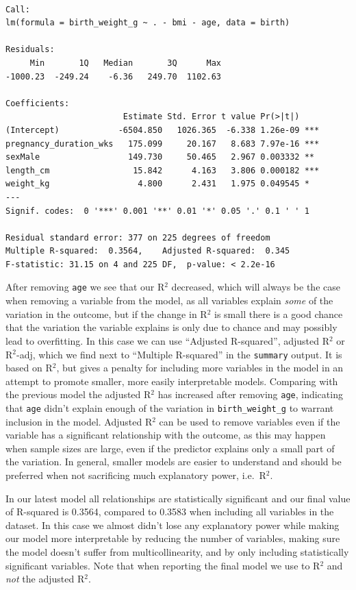 \documentclass[
  letterpaper,
  DIV=11,
  numbers=noendperiod]{scrreprt}
\begin{document}
\begin{verbatim}

Call:
lm(formula = birth_weight_g ~ . - bmi - age, data = birth)

Residuals:
     Min       1Q   Median       3Q      Max 
-1000.23  -249.24    -6.36   249.70  1102.63 

Coefficients:
                        Estimate Std. Error t value Pr(>|t|)    
(Intercept)            -6504.850   1026.365  -6.338 1.26e-09 ***
pregnancy_duration_wks   175.099     20.167   8.683 7.97e-16 ***
sexMale                  149.730     50.465   2.967 0.003332 ** 
length_cm                 15.842      4.163   3.806 0.000182 ***
weight_kg                  4.800      2.431   1.975 0.049545 *  
---
Signif. codes:  0 '***' 0.001 '**' 0.01 '*' 0.05 '.' 0.1 ' ' 1

Residual standard error: 377 on 225 degrees of freedom
Multiple R-squared:  0.3564,    Adjusted R-squared:  0.345 
F-statistic: 31.15 on 4 and 225 DF,  p-value: < 2.2e-16
\end{verbatim}

After removing \texttt{age} we see that our R\(^2\) decreased, which
will always be the case when removing a variable from the model, as all
variables explain \emph{some} of the variation in the outcome, but if
the change in R\(^2\) is small there is a good chance that the variation
the variable explains is only due to chance and may possibly lead to
overfitting. In this case we can use ``Adjusted R-squared'', adjusted
R\(^2\) or R\(^2\)-adj, which we find next to ``Multiple R-squared'' in
the \texttt{summary} output. It is based on R\(^2\), but gives a penalty
for including more variables in the model in an attempt to promote
smaller, more easily interpretable models. Comparing with the previous
model the adjusted R\(^2\) has increased after removing \texttt{age},
indicating that \texttt{age} didn't explain enough of the variation in
\texttt{birth\_weight\_g} to warrant inclusion in the model. Adjusted
R\(^2\) can be used to remove variables even if the variable has a
significant relationship with the outcome, as this may happen when
sample sizes are large, even if the predictor explains only a small part
of the variation. In general, smaller models are easier to understand
and should be preferred when not sacrificing much explanatory power,
i.e.~R\(^2\).

In our latest model all relationships are statistically significant and
our final value of R-squared is 0.3564, compared to 0.3583 when
including all variables in the dataset. In this case we almost didn't
lose any explanatory power while making our model more interpretable by
reducing the number of variables, making sure the model doesn't suffer
from multicollinearity, and by only including statistically significant
variables. Note that when reporting the final model we use to R\(^2\)
and \emph{not} the adjusted R\(^2\).
\end{document}
